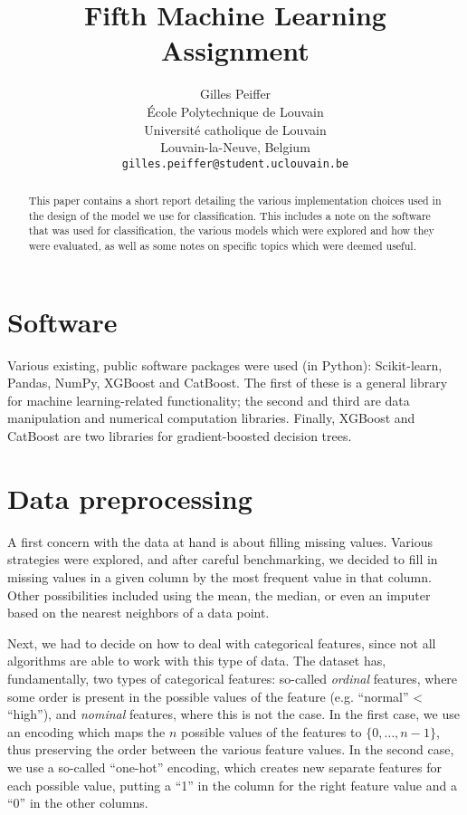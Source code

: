 \documentclass{article}
\title{Fifth Machine Learning Assignment}
\author{%
  Gilles Peiffer \\
  École Polytechnique de Louvain\\
  Université catholique de Louvain\\
  Louvain-la-Neuve, Belgium \\
  \texttt{gilles.peiffer@student.uclouvain.be} \\
}
\begin{document}
\maketitle

\begin{abstract}
This paper contains a short report detailing the various implementation choices used in the design of the model we use for classification.
This includes a note on the software that was used for classification, the various models which were explored and how they were evaluated, as well as some notes on specific topics which were deemed useful.
\end{abstract}

\section{Software}
Various existing, public software packages were used (in Python): Scikit-learn, Pandas, NumPy, XGBoost and CatBoost.
The first of these is a general library for machine learning-related functionality; the second and third are data manipulation and numerical computation libraries.
Finally, XGBoost and CatBoost are two libraries for gradient-boosted decision trees.

\section{Data preprocessing}
\label{sec:pp}
A first concern with the data at hand is about filling missing values.
Various strategies were explored, and after careful benchmarking, we decided to fill in missing values in a given column by the most frequent value in that column.
Other possibilities included using the mean, the median, or even an imputer based on the nearest neighbors of a data point.

Next, we had to decide on how to deal with categorical features, since not all algorithms are able to work with this type of data.
The dataset has, fundamentally, two types of categorical features: so-called \emph{ordinal} features, where some order is present in the possible values of the feature (e.g. ``normal'' < ``high''), and \emph{nominal} features, where this is not the case.
In the first case, we use an encoding which maps the \(n\) possible values of the features to \(\{0, \dots, n-1\}\), thus preserving the order between the various feature values.
In the second case, we use a so-called ``one-hot'' encoding, which creates new separate features for each possible value, putting a ``1'' in the column for the right feature value and a ``0'' in the other columns.
\end{document}
